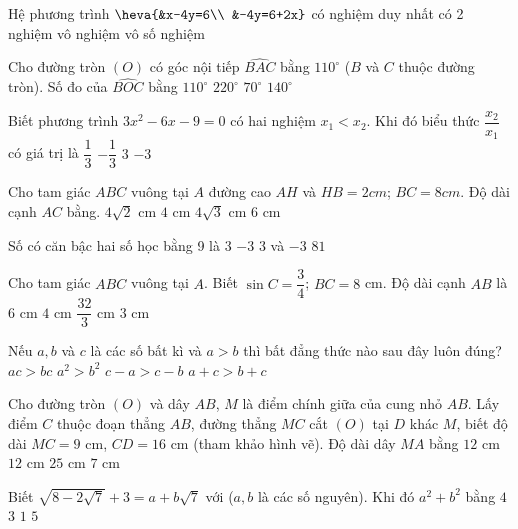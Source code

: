 \begin{ex}
[NB] Hệ phương trình $\heva{&x-4y=6\\ &-4y=6+2x}$
\choice
{\True có nghiệm duy nhất}
{có 2 nghiệm}
{vô nghiệm}
{vô số nghiệm}
\end{ex}
\begin{ex}
[NB] Cho đường tròn $(O)$ có góc nội tiếp $\widehat{BAC}$ bằng $110^\circ$ ($B$ và $C$ thuộc đường tròn). Số đo của $\widehat{BOC}$ bằng
\choice
{$110^\circ$}
{$220^\circ$}
{$70^\circ$}
{\True $140^\circ$}
\end{ex}
\begin{ex}
[NB] Biết phương trình $3x^2-6x-9=0$ có hai nghiệm $x_1<x_2$. Khi đó biểu thức $\dfrac{x_2}{x_1}$ có giá trị là
\choice
{$\dfrac{1}{3}$}
{$-\dfrac{1}{3}$}
{$3$}
{\True $-3$}
\end{ex}
\begin{ex}
[NB] Cho tam giác $ABC$ vuông tại $A$ đường cao $AH$ và $HB=2cm$; $BC=8cm$. Độ dài cạnh $AC$ bằng.
\choice
{$4\sqrt{2}$ cm}
{$4$ cm}
{\True $4\sqrt{3}$ cm}
{$6$ cm}
\end{ex}
\begin{ex}
[NB] Số có căn bậc hai số học bằng 9 là
\choice
{$3$}
{$-3$}
{$3$ và $-3$}
{\True $81$}
\end{ex}
\begin{ex}
Cho tam giác $ABC$ vuông tại $A$. Biết $\sin C=\dfrac{3}{4}$; $BC=8$ cm. Độ dài cạnh $AB$ là
\choice
{\True $6$ cm}
{$4$ cm}
{$\dfrac{32}{3}$ cm}
{$3$ cm}
\end{ex}
\begin{ex}
[NB] Nếu $a, b$ và $c$ là các số bất kì và $a>b$ thì bất đẳng thức nào sau đây luôn đúng?
\choice
{$ac>bc$}
{$a^2>b^2$}
{$c-a>c-b$}
{\True $a+c>b+c$}
\end{ex}
\begin{ex}
[TH] Cho đường tròn $(O)$ và dây $AB$, $M$ là điểm chính giữa của cung nhỏ $AB$. Lấy điểm $C$ thuộc đoạn thẳng $AB$, đường thẳng $MC$ cắt $(O)$ tại $D$ khác $M$, biết độ dài $MC=9$ cm, $CD=16$ cm (tham khảo hình vẽ). Độ dài dây $MA$ bằng
\choice
{$12$ cm}
{\True $12$ cm}
{$25$ cm}
{$7$ cm}
\end{ex}
\begin{ex}
Biết $\sqrt{8-2\sqrt{7}}+3=a+b\sqrt{7}$ với ($a,b$ là các số nguyên). Khi đó $a^2+b^2$ bằng
\choice
{$4$}
{$3$}
{$1$}
{\True $5$}
\end{ex}
